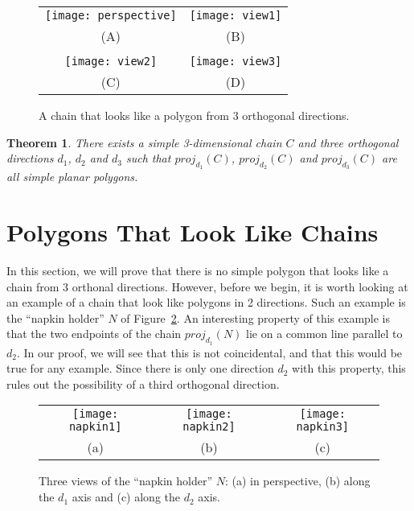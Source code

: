 \documentclass[12pt]{article}
\newcommand{\seclabel}[1]{\label{sec:#1}}
\newcommand{\figlabel}[1]{\label{fig:#1}}
\newcommand{\figref}[1]{\mbox{Figure~\ref{fig:#1}}}
\newtheorem{thm}{Theorem}{\bfseries}{\itshape}
\newcommand{\proj}{\mathit{proj}}
\begin{document}
\begin{figure}
\begin{center}\begin{tabular}{cc}
\texttt{[image: perspective]} & \texttt{[image: view1]} \\
(A) & (B) \\ \\
\texttt{[image: view2]} & \texttt{[image: view3]} \\
(C) & (D)
\end{tabular}\end{center}
\caption{A chain that looks like a polygon from 3 orthogonal directions.}
\figlabel{chain}
\end{figure}

\begin{thm}
There exists a simple 3-dimensional chain $C$ and three orthogonal
directions $d_1$, $d_2$ and $d_3$ such that $\proj_{d_1}(C)$,
$\proj_{d_2}(C)$ and $\proj_{d_3}(C)$ are all simple planar polygons.
\end{thm}

\section{Polygons That Look Like Chains}\seclabel{polygons}

In this section, we will prove that there is no simple polygon that
looks like a chain from 3 orthonal directions.  However, before we
begin, it is worth looking at an example of a chain that look like
polygons in 2 directions.  Such an example is the ``napkin holder''
$N$ of \figref{napkin}.  An interesting property of this example is
that the two endpoints of the chain $\proj_{d_1}(N)$ lie on a common
line parallel to $d_2$.  In our proof, we will see that this is not
coincidental, and that this would be true for any example. Since there
is only one direction $d_2$ with this property, this rules out the
possibility of a third orthogonal direction.

\begin{figure}
\begin{center}
\begin{tabular}{ccc}
\texttt{[image: napkin1]} &
\texttt{[image: napkin2]} &
\texttt{[image: napkin3]} \\
(a) & (b) & (c)
\end{tabular}
\end{center}
\caption{Three views of the ``napkin holder'' $N$: (a) in perspective,
(b) along the $d_1$ axis and (c) along the $d_2$ axis.}
\figlabel{napkin}
\end{figure}
\end{document}
